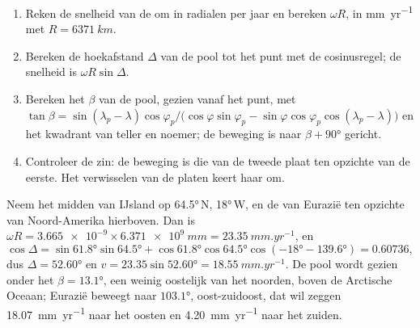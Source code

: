 \begin{method}\label{met:b1:plate-kinematics:velocity}
\begin{enumerate}
  \item Reken de snelheid van de  om in radialen per jaar en bereken $\omega R$, in \unit{mm.yr^{-1}} met $R = \qty{6371}{km}$.
  \item Bereken de hoekafstand $\Delta$ van de pool tot het punt met de cosinusregel; de snelheid is $\omega R\sin\Delta$.
  \item Bereken het  $\beta$ van de pool, gezien vanaf het punt, met $\tan\beta = \sin(\lambda_p - \lambda)\cos\varphi_p /
        \bigl(\cos\varphi\sin\varphi_p - \sin\varphi\cos\varphi_p
        \cos(\lambda_p - \lambda)\bigr)$ en het kwadrant van teller en noemer; de beweging is naar $\beta + \ang{90}$ gericht.
  \item Controleer de zin: de beweging is die van de tweede plaat ten opzichte van de eerste. Het verwisselen van de platen keert haar om.
\end{enumerate}
\end{method}

\begin{example}\label{ex:b1:plate-kinematics:iceland}
Neem het midden van IJsland op \ang{64.5}\,N, \ang{18}\,W, en de  van Eurazië ten opzichte van Noord-Amerika hierboven. Dan is $\omega R =
\num{3.665e-9}\times\qty{6.371e9}{mm} = \qty{23.35}{mm.yr^{-1}}$, en
\[
  \cos\Delta = \sin\ang{61.8}\sin\ang{64.5}
  + \cos\ang{61.8}\cos\ang{64.5}\cos(\ang{-18} - \ang{139.6}) = 0.60736,
\]
dus $\Delta = \ang{52.60}$ en $v = 23.35\sin\ang{52.60} = \qty{18.55}{mm.yr^{-1}}$.
De pool wordt gezien onder het  $\beta = \ang{13.1}$, een weinig oostelijk van het noorden, boven de Arctische Oceaan; Eurazië beweegt naar $\ang{103.1}$, oost-zuidoost, dat wil zeggen \qty{18.07}{mm.yr^{-1}} naar het oosten en \qty{4.20}{mm.yr^{-1}} naar het zuiden.
\end{example}

